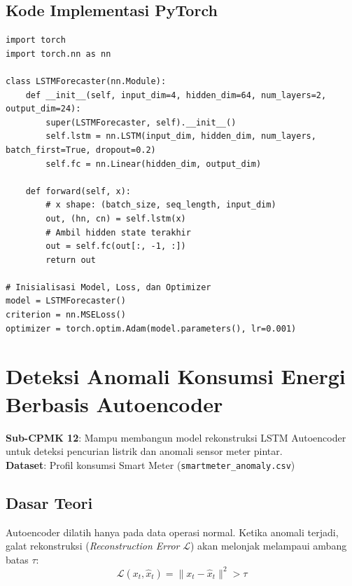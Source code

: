 \documentclass[11pt,a4paper]{report}
\begin{document}
\section{Kode Implementasi PyTorch}
\begin{lstlisting}
import torch
import torch.nn as nn

class LSTMForecaster(nn.Module):
    def __init__(self, input_dim=4, hidden_dim=64, num_layers=2, output_dim=24):
        super(LSTMForecaster, self).__init__()
        self.lstm = nn.LSTM(input_dim, hidden_dim, num_layers, batch_first=True, dropout=0.2)
        self.fc = nn.Linear(hidden_dim, output_dim)
        
    def forward(self, x):
        # x shape: (batch_size, seq_length, input_dim)
        out, (hn, cn) = self.lstm(x)
        # Ambil hidden state terakhir
        out = self.fc(out[:, -1, :])
        return out

# Inisialisasi Model, Loss, dan Optimizer
model = LSTMForecaster()
criterion = nn.MSELoss()
optimizer = torch.optim.Adam(model.parameters(), lr=0.001)
\end{lstlisting}

\newpage

\chapter{Deteksi Anomali Konsumsi Energi Berbasis Autoencoder}

\begin{tcolorbox}[title=Informasi Modul 12]
\textbf{Sub-CPMK 12}: Mampu membangun model rekonstruksi LSTM Autoencoder untuk deteksi pencurian listrik dan anomali sensor meter pintar.\\
\textbf{Dataset}: Profil konsumsi Smart Meter (\texttt{smartmeter\_anomaly.csv})
\end{tcolorbox}

\section{Dasar Teori}
Autoencoder dilatih hanya pada data operasi normal. Ketika anomali terjadi, galat rekonstruksi (\textit{Reconstruction Error} $\mathcal{L}$) akan melonjak melampaui ambang batas $\tau$:
\begin{equation}
    \mathcal{L}(x_t, \hat{x}_t) = \| x_t - \hat{x}_t \|^2 > \tau
\end{equation}
\end{document}
